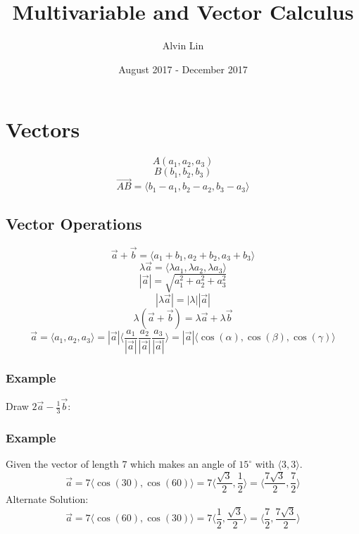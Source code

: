 \documentclass{math}
\title{Multivariable and Vector Calculus}
\author{Alvin Lin}
\date{August 2017 - December 2017}
\begin{document}
\maketitle

\section*{Vectors}
\[ A(a_{1},a_{2},a_{3}) \]
\[ B(b_{1},b_{2},b_{3}) \]
\[ \vec{AB} = \langle b_{1}-a_{1},b_{2}-a_{2},b_{3}-a_{3}\rangle \]

\subsection*{Vector Operations}
\[ \vec{a}+\vec{b} = \langle a_{1}+b_{1},a_{2}+b_{2},a_{3}+b_{3}\rangle \]
\[ \lambda\vec{a} = \langle\lambda a_{1},\lambda a_{2},\lambda a_{3}\rangle \]
\[ |\vec{a}| = \sqrt{a_{1}^{2}+a_{2}^{2}+a_{3}^{2}} \]
\[ |\lambda\vec{a}| = |\lambda||\vec{a}| \]
\[ \lambda(\vec{a}+\vec{b}) = \lambda\vec{a}+\lambda\vec{b} \]
\[ \vec{a} = \langle a_{1},a_{2},a_{3}\rangle =
  |\vec{a}|\langle\frac{a_{1}}{|\vec{a}|}\frac{a_{2}}{|\vec{a}|}
  \frac{a_{3}}{|\vec{a}|}\rangle =
  |\vec{a}|\langle\cos(\alpha),\cos(\beta),\cos(\gamma)\rangle \]

\subsubsection*{Example}
Draw \( 2\vec{a}-\frac{1}{3}\vec{b} \):
\begin{center}
\end{center}

\subsubsection*{Example}
Given the vector of length 7 which makes an angle of \( 15^{\circ} \) with
\( \langle3,3\rangle \).
\[ \vec{a} = 7\langle\cos(30),\cos(60)\rangle =
  7\langle\frac{\sqrt{3}}{2},\frac{1}{2}\rangle =
  \langle\frac{7\sqrt{3}}{2},\frac{7}{2}\rangle \]
Alternate Solution:
\[ \vec{a} = 7\langle\cos(60),\cos(30)\rangle =
  7\langle\frac{1}{2},\frac{\sqrt{3}}{2}\rangle =
  \langle\frac{7}{2},\frac{7\sqrt{3}}{2}\rangle \]
\end{document}
